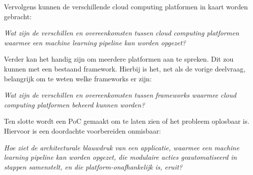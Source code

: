 Vervolgens kunnen de verschillende cloud computing platformen in kaart worden gebracht:

\begin{quoting}
  \begin{center}
    \textit{
      Wat zijn de verschillen en overeenkomsten tussen cloud computing platformen waarmee een machine learning pipeline kan worden opgezet?
    }
  \end{center}
\end{quoting}\smallskip

Verder kan het handig zijn om meerdere platformen aan te spreken. Dit zou kunnen met een bestaand framework. Hierbij is het, net als de vorige deelvraag, belangrijk om te weten welke frameworks er zijn:

\begin{quoting}
  \begin{center}
    \textit{
      Wat zijn de verschillen en overeenkomsten tussen frameworks waarmee cloud computing platformen beheerd kunnen worden?
    }
  \end{center}
\end{quoting}\smallskip

Ten slotte wordt een PoC gemaakt om te laten zien of het probleem oplosbaar is. Hiervoor is een doordachte voorbereiden onmisbaar:

\begin{quoting}
  \begin{center}
    \textit{
      Hoe ziet de architecturale blauwdruk van een applicatie, waarmee een machine learning pipeline kan worden opgezet, die modulaire acties geautomatiseerd in stappen samenstelt, en die platform-onafhankelijk is, eruit?
    }
  \end{center}
\end{quoting}




